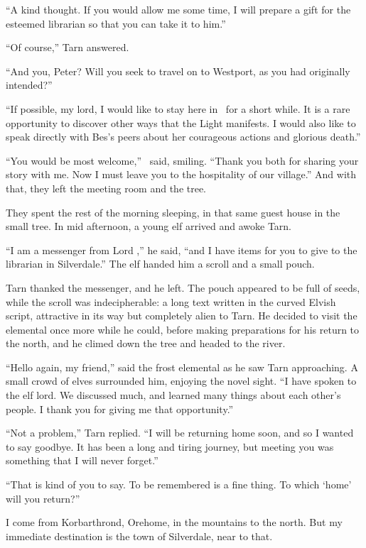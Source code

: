 ``A kind thought.  If you would allow me some time, I will prepare a gift for the esteemed librarian so that you can take it to him.''

``Of course,'' Tarn answered.

``And you, Peter?  Will you seek to travel on to Westport, as you had originally intended?''

``If possible, my lord, I would like to stay here in \inarthonor\ for a short while.  It is a rare opportunity to discover other ways that the Light manifests.  I would also like to speak directly with Bes's peers about her courageous actions and glorious death.''

``You would be most welcome,'' \arilor\ said, smiling.  ``Thank you both for sharing your story with me.  Now I must leave you to the hospitality of our village.''  And with that, they left the meeting room and the tree.

They spent the rest of the morning sleeping, in that same guest house in the small tree.  In mid afternoon, a young elf arrived and awoke Tarn.

``I am a messenger from Lord \arilor,'' he said, ``and I have items for you to give to the librarian in Silverdale.''  The elf handed him a scroll and a small pouch.

Tarn thanked the messenger, and he left.  The pouch appeared to be full of seeds, while the scroll was indecipherable: a long text written in the curved Elvish script, attractive in its way but completely alien to Tarn.  He decided to visit the elemental once more while he could, before making preparations for his return to the north, and he climed down the tree and headed to the river.

``Hello again, my friend,'' said the frost elemental as he saw Tarn approaching.  A small crowd of elves surrounded him, enjoying the novel sight.  ``I have spoken to the elf lord.  We discussed much, and learned many things about each other's people.  I thank you for giving me that opportunity.''

``Not a problem,'' Tarn replied.  ``I will be returning home soon, and so I wanted to say goodbye.  It has been a long and tiring journey, but meeting you was something that I will never forget.''

``That is kind of you to say.  To be remembered is a fine thing.  To which `home' will you return?''

I come from Korbarthrond, Orehome, in the mountains to the north.  But my immediate destination is the town of Silverdale, near to that.

